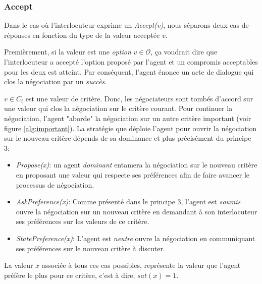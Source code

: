 	
	\subsubsection{Accept}
	Dans le cas où l'interlocuteur exprime un \emph{Accept(v)}, nous séparons deux cas de réponses en fonction du type de la valeur acceptée $v$.
	
	Premièrement, si la valeur est une \textit{option} $ v \in \mathcal{O}$, ça voudrait dire que l'interlocuteur a accepté l'option proposé par l'agent et un compromis acceptables pour les deux est atteint. Par conséquent, l'agent énonce un acte de dialogue qui clos la négociation par un \emph{succès}.
	
	$v \in C_i$ est une valeur de critère. Donc, les négociateurs sont tombés d'accord sur une valeur qui clos la négociation sur le critère courant. Pour continuer la négociation, l'agent "aborde" la négociation sur un autre critère important (voir figure \ref{alg:important}). La stratégie que déploie l'agent pour ouvrir la négociation sur le nouveau critère dépends de sa dominance et plus précisément du principe 3:
	
	\begin{itemize}
		\item \emph{Propose(x)}: un agent \emph{dominant} entamera la négociation sur le nouveau critère en proposant une valeur qui respecte ses préférences afin de faire avancer le processus de négociation. 
		
		\item \emph{AskPreference(x)}: Comme présenté dans le principe 3, l'agent est \emph{soumis} ouvre la négociation sur un nouveau critère en demandant à son interlocuteur ses préférences sur les valeurs de ce critère.
		
		\item \emph{StatePreference(x)}: L'agent est \emph{neutre} ouvre la négociation en communiquant ses préférences sur le nouveau critère à discuter. 
	\end{itemize}
	La	valeur $x$ associée à tous ces cas possibles, représente la valeur que l'agent préfère le plus pour ce critère, c'est à dire, $sat(x) =1$.
	
	
